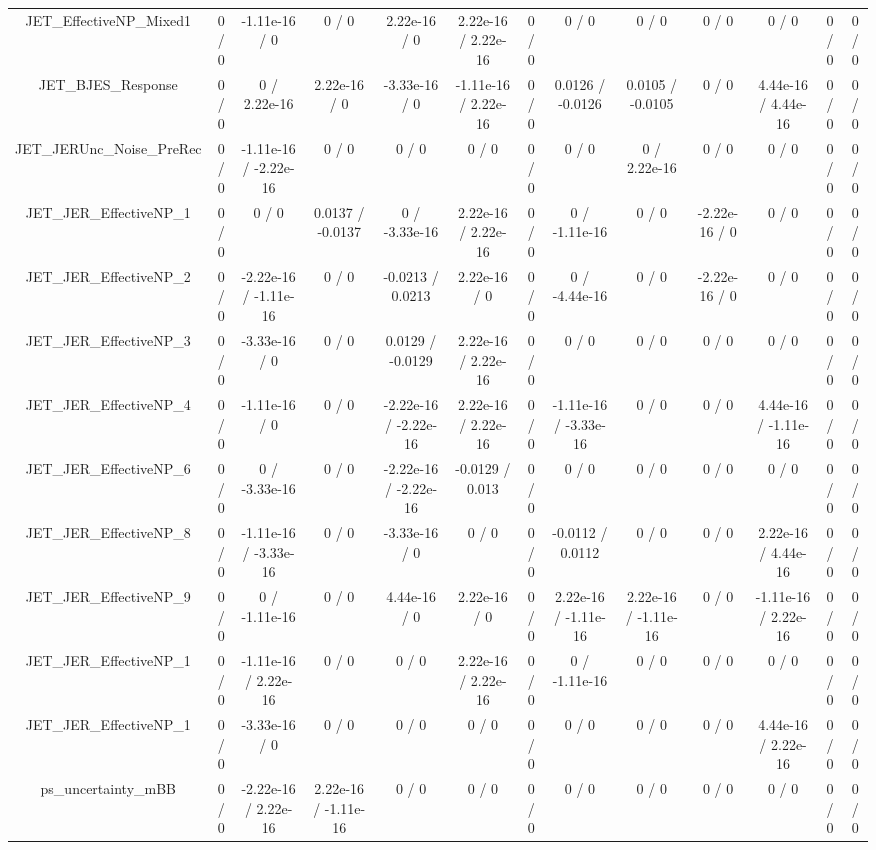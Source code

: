 \documentclass[10pt]{article}
\begin{document}
\begin{table}[htbp]
\begin{center}
\begin{tabular}{|c|c|c|c|c|c|c|c|c|c|c|c|c|}
  JET_EffectiveNP_Mixed1 & 0 / 0 & -1.11e-16 / 0 & 0 / 0 & 2.22e-16 / 0 & 2.22e-16 / 2.22e-16 & 0 / 0 & 0 / 0 & 0 / 0 & 0 / 0 & 0 / 0 & 0 / 0 & 0 / 0 \\ 
  JET_BJES_Response & 0 / 0 & 0 / 2.22e-16 & 2.22e-16 / 0 & -3.33e-16 / 0 & -1.11e-16 / 2.22e-16 & 0 / 0 & 0.0126 / -0.0126 & 0.0105 / -0.0105 & 0 / 0 & 4.44e-16 / 4.44e-16 & 0 / 0 & 0 / 0 \\ 
  JET_JERUnc_Noise_PreRec & 0 / 0 & -1.11e-16 / -2.22e-16 & 0 / 0 & 0 / 0 & 0 / 0 & 0 / 0 & 0 / 0 & 0 / 2.22e-16 & 0 / 0 & 0 / 0 & 0 / 0 & 0 / 0 \\ 
  JET_JER_EffectiveNP_1 & 0 / 0 & 0 / 0 & 0.0137 / -0.0137 & 0 / -3.33e-16 & 2.22e-16 / 2.22e-16 & 0 / 0 & 0 / -1.11e-16 & 0 / 0 & -2.22e-16 / 0 & 0 / 0 & 0 / 0 & 0 / 0 \\ 
  JET_JER_EffectiveNP_2 & 0 / 0 & -2.22e-16 / -1.11e-16 & 0 / 0 & -0.0213 / 0.0213 & 2.22e-16 / 0 & 0 / 0 & 0 / -4.44e-16 & 0 / 0 & -2.22e-16 / 0 & 0 / 0 & 0 / 0 & 0 / 0 \\ 
  JET_JER_EffectiveNP_3 & 0 / 0 & -3.33e-16 / 0 & 0 / 0 & 0.0129 / -0.0129 & 2.22e-16 / 2.22e-16 & 0 / 0 & 0 / 0 & 0 / 0 & 0 / 0 & 0 / 0 & 0 / 0 & 0 / 0 \\ 
  JET_JER_EffectiveNP_4 & 0 / 0 & -1.11e-16 / 0 & 0 / 0 & -2.22e-16 / -2.22e-16 & 2.22e-16 / 2.22e-16 & 0 / 0 & -1.11e-16 / -3.33e-16 & 0 / 0 & 0 / 0 & 4.44e-16 / -1.11e-16 & 0 / 0 & 0 / 0 \\ 
  JET_JER_EffectiveNP_6 & 0 / 0 & 0 / -3.33e-16 & 0 / 0 & -2.22e-16 / -2.22e-16 & -0.0129 / 0.013 & 0 / 0 & 0 / 0 & 0 / 0 & 0 / 0 & 0 / 0 & 0 / 0 & 0 / 0 \\ 
  JET_JER_EffectiveNP_8 & 0 / 0 & -1.11e-16 / -3.33e-16 & 0 / 0 & -3.33e-16 / 0 & 0 / 0 & 0 / 0 & -0.0112 / 0.0112 & 0 / 0 & 0 / 0 & 2.22e-16 / 4.44e-16 & 0 / 0 & 0 / 0 \\ 
  JET_JER_EffectiveNP_9 & 0 / 0 & 0 / -1.11e-16 & 0 / 0 & 4.44e-16 / 0 & 2.22e-16 / 0 & 0 / 0 & 2.22e-16 / -1.11e-16 & 2.22e-16 / -1.11e-16 & 0 / 0 & -1.11e-16 / 2.22e-16 & 0 / 0 & 0 / 0 \\ 
  JET_JER_EffectiveNP_1 & 0 / 0 & -1.11e-16 / 2.22e-16 & 0 / 0 & 0 / 0 & 2.22e-16 / 2.22e-16 & 0 / 0 & 0 / -1.11e-16 & 0 / 0 & 0 / 0 & 0 / 0 & 0 / 0 & 0 / 0 \\ 
  JET_JER_EffectiveNP_1 & 0 / 0 & -3.33e-16 / 0 & 0 / 0 & 0 / 0 & 0 / 0 & 0 / 0 & 0 / 0 & 0 / 0 & 0 / 0 & 4.44e-16 / 2.22e-16 & 0 / 0 & 0 / 0 \\ 
  ps_uncertainty_mBB & 0 / 0 & -2.22e-16 / 2.22e-16 & 2.22e-16 / -1.11e-16 & 0 / 0 & 0 / 0 & 0 / 0 & 0 / 0 & 0 / 0 & 0 / 0 & 0 / 0 & 0 / 0 & 0 / 0 \\ 

\end{tabular}
\end{center}
\end{table}
\end{document}
